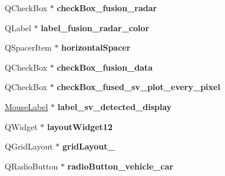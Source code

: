 \begin{DoxyCompactItemize}
\item 
\hypertarget{class_ui___main_window_a9a057c7fdf9e2336a10dc84f1302fc17}{}Q\+Check\+Box $\ast$ {\bfseries check\+Box\+\_\+fusion\+\_\+radar}\label{class_ui___main_window_a9a057c7fdf9e2336a10dc84f1302fc17}

\item 
\hypertarget{class_ui___main_window_ad9d4f69ac4a99c2baa0d7187cf147fb0}{}Q\+Label $\ast$ {\bfseries label\+\_\+fusion\+\_\+radar\+\_\+color}\label{class_ui___main_window_ad9d4f69ac4a99c2baa0d7187cf147fb0}

\item 
\hypertarget{class_ui___main_window_a7871ea8c4b6c595d7ccd53960b344719}{}Q\+Spacer\+Item $\ast$ {\bfseries horizontal\+Spacer}\label{class_ui___main_window_a7871ea8c4b6c595d7ccd53960b344719}

\item 
\hypertarget{class_ui___main_window_ab3c17036e06558f71eb8a1ecf0917201}{}Q\+Check\+Box $\ast$ {\bfseries check\+Box\+\_\+fusion\+\_\+data}\label{class_ui___main_window_ab3c17036e06558f71eb8a1ecf0917201}

\item 
\hypertarget{class_ui___main_window_a256d057081e055c1c7ed07bdac5f9b96}{}Q\+Check\+Box $\ast$ {\bfseries check\+Box\+\_\+fused\+\_\+sv\+\_\+plot\+\_\+every\+\_\+pixel}\label{class_ui___main_window_a256d057081e055c1c7ed07bdac5f9b96}

\item 
\hypertarget{class_ui___main_window_a4f1206e78dd6b0ca835fe19e13f8ee39}{}\hyperlink{class_mouse_label}{Mouse\+Label} $\ast$ {\bfseries label\+\_\+sv\+\_\+detected\+\_\+display}\label{class_ui___main_window_a4f1206e78dd6b0ca835fe19e13f8ee39}

\item 
\hypertarget{class_ui___main_window_a6ee4849e48d8a0fd6e12e68dfb98bc1d}{}Q\+Widget $\ast$ {\bfseries layout\+Widget12}\label{class_ui___main_window_a6ee4849e48d8a0fd6e12e68dfb98bc1d}

\item 
\hypertarget{class_ui___main_window_a4fc0865a2fea446b284d1db5fc111211}{}Q\+Grid\+Layout $\ast$ {\bfseries grid\+Layout\+\_}\label{class_ui___main_window_a4fc0865a2fea446b284d1db5fc111211}

\item 
\hypertarget{class_ui___main_window_adbc3c1f79f70bbc17064c9dab4014504}{}Q\+Radio\+Button $\ast$ {\bfseries radio\+Button\+\_\+vehicle\+\_\+car}\label{class_ui___main_window_adbc3c1f79f70bbc17064c9dab4014504}


\end{DoxyCompactItemize}
